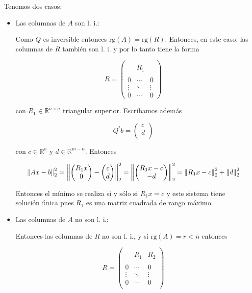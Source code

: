 Tenemos dos casos:
\begin{itemize}
\item Las columnas de $A$ son l. i.:

Como $Q$ es inversible entonces $\text{rg}(A) = \text{rg}(R)$. Entonces, en este caso, las columnas de $R$ también son l. i. y por lo tanto tiene la forma

\[R = \begin{pmatrix}
& 		& \\
& R_1	& \\
& 	 & \\
0& \cdots & 0 \\
\vdots & \ddots & \vdots \\
0 & \cdots & 0
\end{pmatrix}\]

con $R_1 \in \mathbb{R}^{n \times n}$ triangular superior. Escribamos además

\[Q^tb = \begin{pmatrix}
c 	\\
d	\\
\end{pmatrix}\]

con $c \in \mathbb{R}^{n}$ y $d \in \mathbb{R}^{m - n}$. Entonces

\[\left\lVert Ax - b\right\rVert_2^2 = \left\lVert\begin{pmatrix}
R_1x 	\\
0		\\
\end{pmatrix} - \begin{pmatrix}
c 	\\
d	\\
\end{pmatrix}\right\rVert_2^2 = \left\lVert\begin{pmatrix}
R_1x - c 	\\
-d			\\
\end{pmatrix}\right\rVert_2^2 = \left\lVert R_1 x - c\right\rVert_2^2 + \left\lVert d\right\rVert_2^2\]

Entonces el mínimo se realiza si y sólo si $R_1x = c$ y este sistema tiene solución única pues $R_1$ es una matriz cuadrada de rango máximo.

\item Las columnas de $A$ no son l. i.:

Entonces las columnas de $R$ no son l. i., y si $\text{rg}(A) = r < n$ entonces

\[R = \begin{pmatrix}
		&			&		\\
		& R_1		& R_2 	\\
		&			& 		\\
0		& \cdots 	& 0		\\
\vdots	& \ddots		& \vdots\\
0		& \cdots 	& 0 		\\
\end{pmatrix}\]


\end{itemize}
